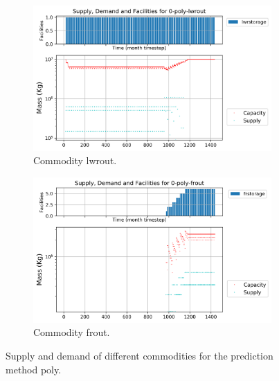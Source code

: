 \documentclass[11pt]{article}
\begin{document}
\begin{figure}[!h]
	\centering
	\begin{subfigure}[]{0.45\textwidth}
		\centering
		\includegraphics[width=\linewidth]{23-figures/0-poly-lwrout.png} 
		\caption{Commodity lwrout.}
		\label{fig:23-lwrout}
	\end{subfigure}
	\vspace{1cm}
	\begin{subfigure}[]{0.45\textwidth}
		\centering
		\includegraphics[width=\linewidth]{23-figures/0-poly-frout.png} 
		\caption{Commodity frout.}
		\label{fig:23-frout}
	\end{subfigure}
	\hfill
	\caption{Supply and demand of different commodities for the prediction method poly.}
	\label{fig:23-out}
\end{figure}
\end{document}
